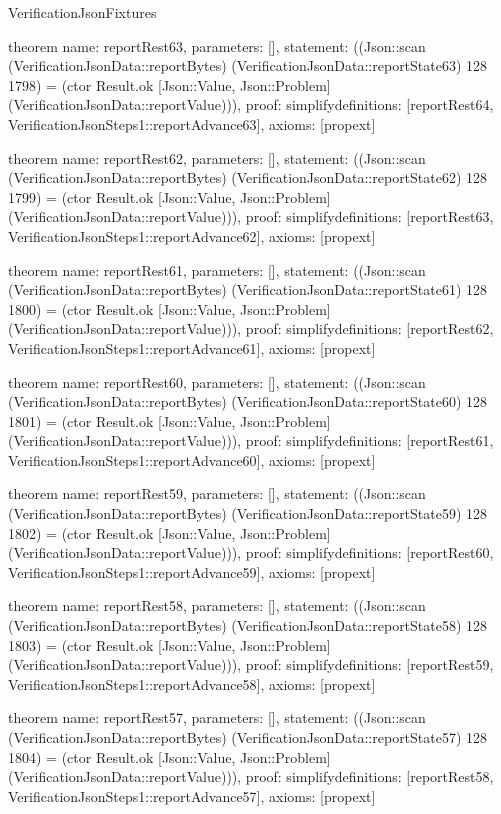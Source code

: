 \begin{lexlean}{VerificationJsonFixtures}
\begin{semanticmodule}
theorem{
  name: reportRest63,
  parameters: [],
  statement: ((Json::scan (VerificationJsonData::reportBytes) (VerificationJsonData::reportState63) 128 1798) = (ctor Result.ok [Json::Value, Json::Problem] (VerificationJsonData::reportValue))),
  proof: simplify{definitions: [reportRest64, VerificationJsonSteps1::reportAdvance63]},
  axioms: [propext]
}

theorem{
  name: reportRest62,
  parameters: [],
  statement: ((Json::scan (VerificationJsonData::reportBytes) (VerificationJsonData::reportState62) 128 1799) = (ctor Result.ok [Json::Value, Json::Problem] (VerificationJsonData::reportValue))),
  proof: simplify{definitions: [reportRest63, VerificationJsonSteps1::reportAdvance62]},
  axioms: [propext]
}

theorem{
  name: reportRest61,
  parameters: [],
  statement: ((Json::scan (VerificationJsonData::reportBytes) (VerificationJsonData::reportState61) 128 1800) = (ctor Result.ok [Json::Value, Json::Problem] (VerificationJsonData::reportValue))),
  proof: simplify{definitions: [reportRest62, VerificationJsonSteps1::reportAdvance61]},
  axioms: [propext]
}

theorem{
  name: reportRest60,
  parameters: [],
  statement: ((Json::scan (VerificationJsonData::reportBytes) (VerificationJsonData::reportState60) 128 1801) = (ctor Result.ok [Json::Value, Json::Problem] (VerificationJsonData::reportValue))),
  proof: simplify{definitions: [reportRest61, VerificationJsonSteps1::reportAdvance60]},
  axioms: [propext]
}

theorem{
  name: reportRest59,
  parameters: [],
  statement: ((Json::scan (VerificationJsonData::reportBytes) (VerificationJsonData::reportState59) 128 1802) = (ctor Result.ok [Json::Value, Json::Problem] (VerificationJsonData::reportValue))),
  proof: simplify{definitions: [reportRest60, VerificationJsonSteps1::reportAdvance59]},
  axioms: [propext]
}

theorem{
  name: reportRest58,
  parameters: [],
  statement: ((Json::scan (VerificationJsonData::reportBytes) (VerificationJsonData::reportState58) 128 1803) = (ctor Result.ok [Json::Value, Json::Problem] (VerificationJsonData::reportValue))),
  proof: simplify{definitions: [reportRest59, VerificationJsonSteps1::reportAdvance58]},
  axioms: [propext]
}

theorem{
  name: reportRest57,
  parameters: [],
  statement: ((Json::scan (VerificationJsonData::reportBytes) (VerificationJsonData::reportState57) 128 1804) = (ctor Result.ok [Json::Value, Json::Problem] (VerificationJsonData::reportValue))),
  proof: simplify{definitions: [reportRest58, VerificationJsonSteps1::reportAdvance57]},
  axioms: [propext]
}


\end{semanticmodule}
\end{lexlean}
